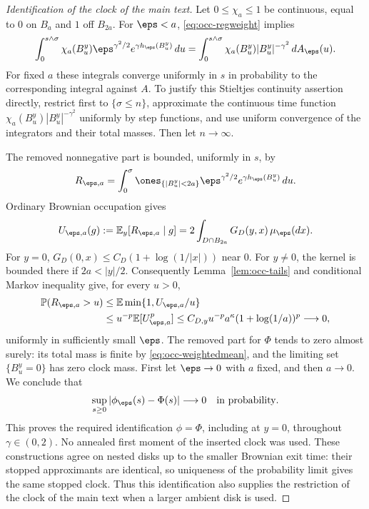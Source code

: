 \begin{proof}[Identification of the clock of the main text]
Let $0\leq\chi_a\leq1$ be continuous, equal to $0$ on $B_a$ and $1$
off $B_{2a}$.
For $\eps<a$, \eqref{eq:occ-regweight} implies
\[
 \int_0^{s\wedge\sigma}\chi_a(B^y_u)
       \eps^{\gamma^2/2}e^{\gamma h_\eps(B^y_u)}\,du
   =\int_0^{s\wedge\sigma}
        \chi_a(B^y_u)|B^y_u|^{-\gamma^2}\,dA_\eps(u).
\]
For fixed $a$ these integrals converge uniformly in $s$ in probability
to the corresponding integral against $A$. To justify this
Stieltjes continuity assertion directly, restrict first to
$\{\sigma\leq n\}$, approximate the continuous time function
$\chi_a(B^y_u)|B^y_u|^{-\gamma^2}$ uniformly by step functions,
and use uniform convergence of the integrators and their total masses.
Then let $n\to\infty$.

The removed nonnegative part is bounded, uniformly in $s$, by
\[
 R_{\eps,a}=\int_0^\sigma\ones_{\{|B^y_u|<2a\}}
                  \eps^{\gamma^2/2}e^{\gamma h_\eps(B^y_u)}\,du.
\]
Ordinary Brownian occupation gives
\[
 U_{\eps,a}(g):=\mathbb{E}_y[R_{\eps,a}\mid g]
       =2\int_{D\cap B_{2a}}G_D(y,x)\,\mu_\eps(dx).
\]
For $y=0$, $G_D(0,x)\leq C_D(1+\log(1/|x|))$ near $0$.
For $y\ne0$, the kernel is bounded there if $2a<|y|/2$.
Consequently Lemma~\ref{lem:occ-tails} and conditional Markov inequality
give, for every $u>0$,
\begin{align*}
 \mathbb{P}(R_{\eps,a}>u)
 &\leq\mathbb{E}\min\{1,U_{\eps,a}/u\}\\
 &\leq u^{-p}\mathbb{E}[U_{\eps,a}^p]
 \leq C_{D,y}u^{-p}a^\kappa(1+\log(1/a))^p\longrightarrow0 ,
\end{align*}
uniformly in sufficiently small $\eps$. The removed part for $\Phi$
tends to zero almost surely: its total mass is finite by
\eqref{eq:occ-weightedmean}, and the limiting set $\{B^y_u=0\}$ has
zero clock mass. First let $\eps\to0$ with $a$ fixed, and then
$a\to0$. We conclude that
\[
 \sup_{s\geq0}|\phi_\eps(s)-\Phi(s)|\longrightarrow0
       \quad\text{in probability}.
\]
This proves the required identification $\phi=\Phi$, including
at $y=0$, throughout $\gamma\in(0,2)$.
No annealed first moment of the inserted clock was used.
These constructions agree on nested disks up to the smaller Brownian
exit time: their stopped approximants are identical, so uniqueness
of the probability limit gives the same stopped clock. Thus this
identification also supplies the restriction of the clock of the main text
when a larger ambient disk is used.
\end{proof}

